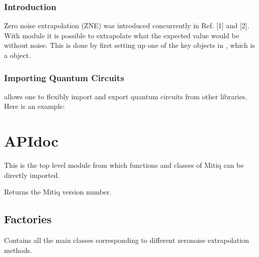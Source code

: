 \documentclass[letterpaper,10pt,english]{sphinxmanual}
\begin{document}
\subsection{Introduction}
\label{\detokenize{guide/guide-zne:introduction}}
Zero noise extrapolation (ZNE) was introduced concurrently in Ref. {[}1{]} and {[}2{]}.
With  module it is possible to extrapolate what the expected value would be without noise. This is done by first setting up one of the key objects in , which is a  object.


\subsection{Importing Quantum Circuits}
\label{\detokenize{guide/guide-zne:importing-quantum-circuits}}
 allows one to flexibly import and export quantum circuits from other libraries. Here is an example:

\begin{sphinxVerbatim}[commandchars=\\\{\}]
   
\end{sphinxVerbatim}


\chapter{API\sphinxhyphen{}doc}
\label{\detokenize{index:module-mitiq}}\label{\detokenize{index:api-doc}}
This is the top level module from which functions and classes of
Mitiq can be directly imported.

\begin{fulllineitems}
\label{\detokenize{index:mitiq.version}}
Returns the Mitiq version number.

\end{fulllineitems}



\section{Factories}
\label{\detokenize{index:module-mitiq.factories}}\label{\detokenize{index:factories}}
Contains all the main classes corresponding to different zero\sphinxhyphen{}noise extrapolation methods.
\end{document}
